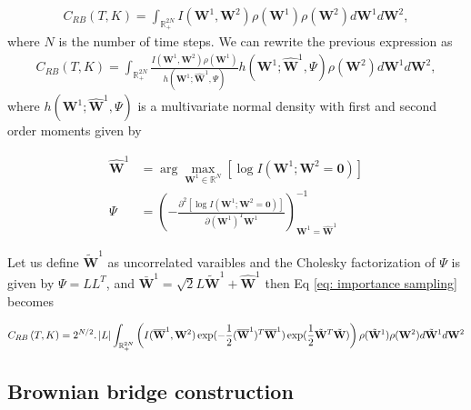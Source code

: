 \documentclass[11pt]{article}
\newcommand{\rset}{\mathbb{R}}
\newcommand{\COMMA}{,}
\begin{document}
\begin{align}
	C_{RB}\left( T, K \right)=  \int_{\rset_+^{2N}} I(\mathbf{W}^1,\mathbf{W}^2)  \rho(\mathbf{W}^1) \rho(\mathbf{W}^2) d \mathbf{W}^1  d\mathbf{W}^2 \COMMA
\end{align}
where $N$ is the number of time steps. We can rewrite the previous expression as
\begin{align}\label{eq: importance sampling}
	C_{RB}\left( T, K \right)=  \int_{\rset_+^{2N}} \frac{I(\mathbf{W}^1,\mathbf{W}^2)\rho(\mathbf{W}^1)}{h(\mathbf{W}^1;\hat{\mathbf{W}}^1,\Psi)} {h(\mathbf{W}^1;\hat{\mathbf{W}}^1,\Psi)} \rho(\mathbf{W}^2) d \mathbf{W}^1  d\mathbf{W}^2 \COMMA
\end{align}
where $h(\mathbf{W}^1;\hat{\mathbf{W}}^1,\Psi)$ is a multivariate normal density with first and second order moments given by

\begin{align}\label{eq:Gaussian moments}
	\hat{\mathbf{W}}^1&=\operatorname{arg} \underset{\mathbf{W}^1 \in \rset^{N} }{\max}	[ \log I(\mathbf{W}^1;\mathbf{W}^2=\mathbf{0})] \\
	\Psi &=\left(- \frac{\partial^2[\log I(\mathbf{W}^1;\mathbf{W}^2=\mathbf{0})]}{\partial (\mathbf{W}^1)^{T} \mathbf{W}^1} \right)^{-1}_{\mathbf{W}^1=\hat{\mathbf{W}}^1}
\end{align}

Let us define $\tilde{\mathbf{W}}^1$ as uncorrelated varaibles and the Cholesky factorization of $\Psi$ is given by $\Psi=L L^{T}$, and $\bar{\mathbf{W}}^1=\sqrt{2} L \tilde{\mathbf{W}}^1+\hat{\mathbf{W}}^1$ then Eq \ref{eq: importance sampling} becomes 

\begin{align}
	C_{RB}\left( T, K \right)=2^{N/2}. \abs{L} \int_{\rset_+^{2N}} \left( I(\bar{\mathbf{W}}^1,\mathbf{W}^2)  \exp(-\frac{1}{2}(\bar{\mathbf{W}}^1)^T \bar{\mathbf{W}}^1) \exp(\frac{1}{2}\tilde{\mathbf{W}}^T \tilde{\mathbf{W}}) \right)   \rho(\tilde{\mathbf{W}}^1) \rho(\mathbf{W}^2) d \tilde{\mathbf{W}}^1 d\mathbf{W}^2 
\end{align}



%
\subsection{Brownian bridge construction}\label{sec:Brwonian bridge construction}
\end{document}
